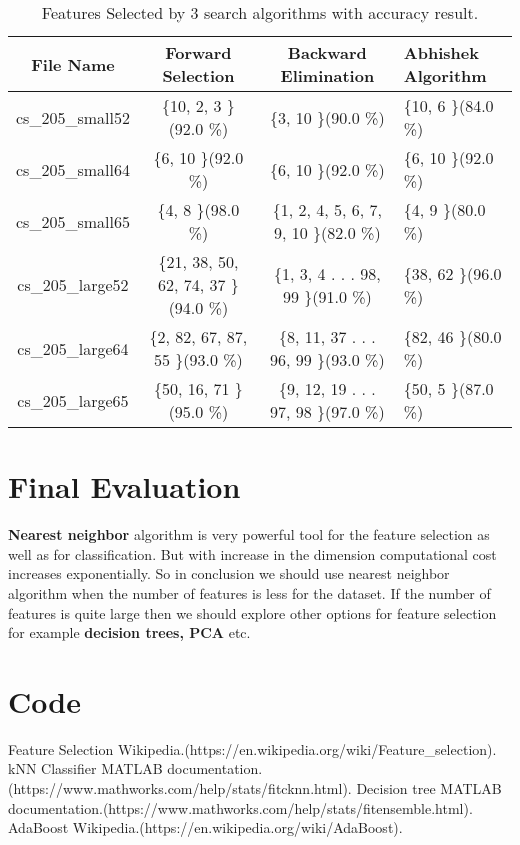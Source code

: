 \documentclass[a4paper, 11pt]{article}
\begin{document}
\begin{table}
	\centering
	\caption{Features Selected by 3 search algorithms with accuracy result.}
	\begin{tabular}{|c|c|c|l|} \hline
		File Name&Forward Selection&Backward Elimination&Abhishek Algorithm\\ \hline
		cs\_205\_small52 & \{10, 2, 3 \}(92.0 \%) & \{3, 10 \}(90.0 \%) & \{10, 6 \}(84.0 \%)\\ \hline
		cs\_205\_small64 & \{6, 10 \}(92.0 \%) & \{6, 10 \}(92.0 \%) &\{6, 10 \}(92.0 \%)\\ \hline
		cs\_205\_small65 & \{4, 8 \}(98.0 \%) & \{1, 2, 4, 5, 6, 7, 9, 10 \}(82.0 \%) & \{4, 9 \}(80.0 \%)\\ \hline
		cs\_205\_large52 & \{21, 38, 50, 62, 74, 37 \}(94.0 \%) & \{1, 3, 4 . . . 98, 99 \}(91.0 \%)& \{38, 62 \}(96.0 \%)\\ \hline
		cs\_205\_large64 & \{2, 82, 67, 87, 55 \}(93.0 \%) & \{8, 11, 37 . . . 96, 99 \}(93.0 \%) & \{82, 46 \}(80.0 \%)\\ \hline
		cs\_205\_large65 & \{50, 16, 71 \}(95.0 \%) & \{9, 12, 19 . . . 97, 98 \}(97.0 \%) & \{50, 5 \}(87.0 \%)\\ \hline
	\end{tabular}
\end{table} 

\section*{Final Evaluation}
\textbf{Nearest neighbor} algorithm is very powerful tool for the feature selection as well as for classification. But with increase in the dimension computational cost increases exponentially. So in conclusion we should use nearest neighbor algorithm when the number of features is less for the dataset. If the number of features is quite large then we should explore other options for feature selection for example \textbf{decision trees, PCA} etc.

\section*{Code}


\begin{thebibliography}{9}
 Feature Selection Wikipedia.(https://en.wikipedia.org/wiki/Feature\_selection).
kNN Classifier MATLAB documentation.(https://www.mathworks.com/help/stats/fitcknn.html).
Decision tree MATLAB documentation.(https://www.mathworks.com/help/stats/fitensemble.html).
 AdaBoost Wikipedia.(https://en.wikipedia.org/wiki/AdaBoost).
\end{thebibliography}
\end{document}
